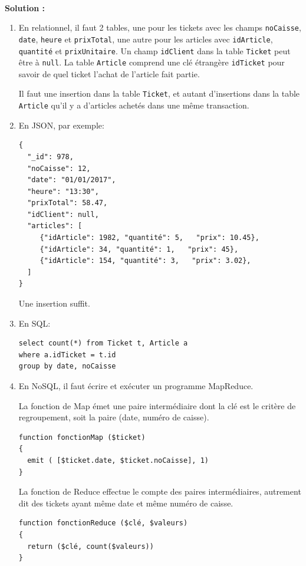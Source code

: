 \documentclass[11pt,a4paper]{article}
\newenvironment{solution}[0]{
~\\ \color{red} \textbf{Solution : }\color{black}}{%
}
\begin{document}
\begin{solution}

\begin{enumerate}
   \item En relationnel, il faut 2 tables, une pour les tickets avec les champs \texttt{noCaisse},
      \texttt{date}, \texttt{heure} et \texttt{prixTotal}, une autre pour les articles avec \texttt{idArticle},
         \texttt{quantité} et \texttt{prixUnitaire}. Un champ \texttt{idClient}
          dans la table \texttt{Ticket} peut être à \texttt{null}. La table \texttt{Article} comprend
         une clé étrangère \texttt{idTicket} pour savoir de quel ticket l'achat de l'article fait partie.
         
          Il faut une insertion dans la table \texttt{Ticket},
           et autant d'insertions dans la table \texttt{Article} qu'il y a d'articles achetés dans
           une même transaction. 
      
      \item En JSON, par exemple:

\begin{verbatim}
{
  "_id": 978,
  "noCaisse": 12,
  "date": "01/01/2017",
  "heure": "13:30",
  "prixTotal": 58.47,
  "idClient": null,
  "articles": [
     {"idArticle": 1982, "quantité": 5,   "prix": 10.45},
     {"idArticle": 34, "quantité": 1,   "prix": 45},
     {"idArticle": 154, "quantité": 3,   "prix": 3.02},
  ]
}
\end{verbatim}

Une insertion suffit.

\item En SQL:

\begin{verbatim}
select count(*) from Ticket t, Article a 
where a.idTicket = t.id
group by date, noCaisse
\end{verbatim}

\item En NoSQL, il faut écrire et exécuter un programme MapReduce.

La fonction de Map émet  une paire intermédiaire dont la clé est le critère de regroupement,
soit la paire (date, numéro de caisse).

\begin{verbatim}
function fonctionMap ($ticket)
{
  emit ( [$ticket.date, $ticket.noCaisse], 1)
}
\end{verbatim}

La fonction de Reduce effectue le compte des paires intermédiaires, autrement dit des tickets
ayant même  date et même numéro de caisse.

\begin{verbatim}
function fonctionReduce ($clé, $valeurs)
{
  return ($clé, count($valeurs))
}
\end{verbatim}
\end{enumerate}
\end{solution}
\end{document}
